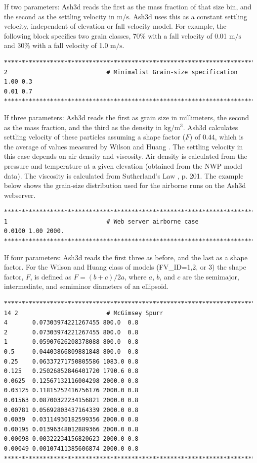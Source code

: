 If two parameters: Ash3d reads the first as the mass fraction of that size bin, and
the second as the settling velocity in $\mathrm{m/s}$. Ash3d uses this as a constant settling
velocity, independent of elevation or fall velocity model. For example, the following block
specifies two grain classes, 70\% with a fall velocity of 0.01 $\mathrm{m/s}$ and 
30\% with a fall velocity of 1.0 $\mathrm{m/s}$.
\small
\begin{verbatim}
*******************************************************************************
2                            # Minimalist Grain-size specification
1.00 0.3
0.01 0.7
*******************************************************************************
\end{verbatim}
\normalsize
If three parameters: Ash3d reads the first as grain size in millimeters, the second
as the mass fraction, and the third as the density in $\mathrm{kg/m^3}$.
Ash3d calculates settling
velocity of these particles assuming a shape factor ($F$) of $0.44$, which is the average
of values measured by Wilson and Huang \cite{Wilson79}. The settling velocity in this case
depends on air density and viscosity. Air density is calculated from the pressure
and temperature at a
given elevation (obtained from the NWP model data). The viscosity is calculated from
Sutherland’s Law \cite{Jacobson05}, p. 201. The example below shows the grain-size
distribution used for the airborne runs on the Ash3d webserver.
\small
\begin{verbatim}
*******************************************************************************
1                            # Web server airborne case
0.0100 1.00 2000.
*******************************************************************************
\end{verbatim}
\normalsize
If four parameters: Ash3d reads the first three as before, and the last as a
shape factor. For the Wilson and Huang class of models (FV\_ID=1,2, or 3)
the shape factor, $F$, is defined as $F=(b+c)/2a$, where $a$, $b$, and $c$ are the
semimajor, intermediate, and semiminor diameters of an ellipsoid.
\small
\begin{verbatim}
*******************************************************************************
14 2                         # McGimsey Spurr
4       0.07303974221267455 800.0  0.8
2       0.07303974221267455 800.0  0.8
1       0.05907626208378088 800.0  0.8
0.5     0.04403866809881848 800.0  0.8
0.25    0.06337271750805586 1083.0 0.8
0.125   0.25026852846401720 1790.6 0.8
0.0625  0.12567132116004298 2000.0 0.8
0.03125 0.11815252416756176 2000.0 0.8
0.01563 0.08700322234156821 2000.0 0.8
0.00781 0.05692803437164339 2000.0 0.8
0.0039  0.03114930182599356 2000.0 0.8
0.00195 0.01396348012889366 2000.0 0.8
0.00098 0.00322234156820623 2000.0 0.8
0.00049 0.00107411385606874 2000.0 0.8
*******************************************************************************
\end{verbatim}
